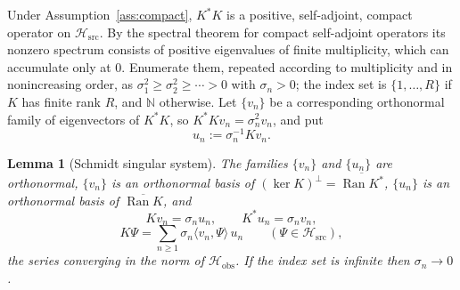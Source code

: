\documentclass[11pt,reqno]{amsart}
\numberwithin{equation}{section}
\theoremstyle{plain}
\newtheorem{lemma}[theorem]{Lemma}
\theoremstyle{definition}
\theoremstyle{remark}
\newcommand{\Hsrc}{\mathcal{H}_{\mathrm{src}}}
\newcommand{\Hobs}{\mathcal{H}_{\mathrm{obs}}}
\newcommand{\Ran}{\operatorname{Ran}}
\newcommand{\inner}[2]{\langle #1 , #2 \rangle}
\begin{document}
Under Assumption~\ref{ass:compact}, $K^{*}K$ is a positive, self-adjoint, compact operator
on $\Hsrc$. By the spectral theorem for compact self-adjoint operators
\cite[Ch.~VI]{ReedSimon1} its nonzero spectrum consists of positive eigenvalues of finite
multiplicity, which can accumulate only at $0$. Enumerate them, repeated according to
multiplicity and in nonincreasing order, as $\sigma_{1}^{2}\ge\sigma_{2}^{2}\ge\cdots>0$ with
$\sigma_{n}>0$; the index set is $\{1,\dots,R\}$ if $K$ has finite rank $R$, and $\mathbb{N}$
otherwise. Let $\{v_{n}\}$ be a corresponding orthonormal family of eigenvectors of $K^{*}K$,
so $K^{*}Kv_{n}=\sigma_{n}^{2}v_{n}$, and put
\begin{equation}
\label{eq:svectors}
u_{n}:=\sigma_{n}^{-1}Kv_{n}.
\end{equation}

\begin{lemma}[Schmidt singular system]
\label{lem:schmidt}
The families $\{v_{n}\}$ and $\{u_{n}\}$ are orthonormal, $\{v_{n}\}$ is an orthonormal
basis of $(\ker K)^{\perp}=\overline{\Ran K^{*}}$, $\{u_{n}\}$ is an orthonormal basis of
$\overline{\Ran K}$, and
\begin{equation}
\label{eq:sv}
Kv_{n}=\sigma_{n}u_{n},
\qquad
K^{*}u_{n}=\sigma_{n}v_{n},
\end{equation}
\begin{equation}
\label{eq:svd}
K\Psi=\sum_{n\ge1}\sigma_{n}\inner{v_{n}}{\Psi}\,u_{n}
\qquad(\Psi\in\Hsrc),
\end{equation}
the series converging in the norm of $\Hobs$. If the index set is infinite then
$\sigma_{n}\to0$.
\end{lemma}
\end{document}
